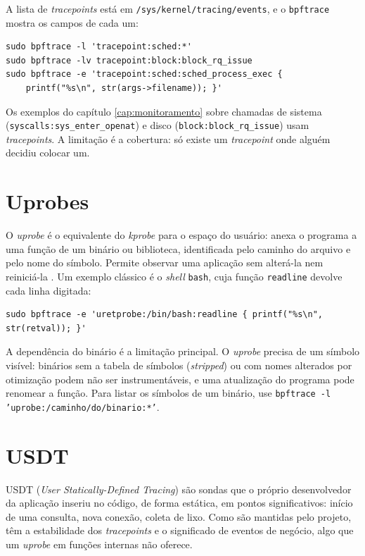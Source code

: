 A lista de \textit{tracepoints} está em \texttt{/sys/kernel/tracing/events}, e o \texttt{bpftrace} mostra os campos de cada um:

\begin{lstlisting}
sudo bpftrace -l 'tracepoint:sched:*'
sudo bpftrace -lv tracepoint:block:block_rq_issue
sudo bpftrace -e 'tracepoint:sched:sched_process_exec {
    printf("%s\n", str(args->filename)); }'
\end{lstlisting}

Os exemplos do capítulo \ref{cap:monitoramento} sobre chamadas de sistema (\texttt{syscalls:sys\_enter\_openat}) e disco (\texttt{block:block\_rq\_issue}) usam \textit{tracepoints}. A limitação é a cobertura: só existe um \textit{tracepoint} onde alguém decidiu colocar um.

\section{Uprobes}\label{sec:uprobes}

O \textit{uprobe} é o equivalente do \textit{kprobe} para o espaço do usuário: anexa o programa a uma função de um binário ou biblioteca, identificada pelo caminho do arquivo e pelo nome do símbolo. Permite observar uma aplicação sem alterá-la nem reiniciá-la \cite{gregg2019}. Um exemplo clássico é o \textit{shell} \texttt{bash}, cuja função \texttt{readline} devolve cada linha digitada:

\begin{lstlisting}
sudo bpftrace -e 'uretprobe:/bin/bash:readline { printf("%s\n", str(retval)); }'
\end{lstlisting}

A dependência do binário é a limitação principal. O \textit{uprobe} precisa de um símbolo visível: binários sem a tabela de símbolos (\textit{stripped}) ou com nomes alterados por otimização podem não ser instrumentáveis, e uma atualização do programa pode renomear a função. Para listar os símbolos de um binário, use \texttt{bpftrace -l 'uprobe:/caminho/do/binario:*'}.

\section{USDT}

USDT (\textit{User Statically-Defined Tracing}) são sondas que o próprio desenvolvedor da aplicação inseriu no código, de forma estática, em pontos significativos: início de uma consulta, nova conexão, coleta de lixo. Como são mantidas pelo projeto, têm a estabilidade dos \textit{tracepoints} e o significado de eventos de negócio, algo que um \textit{uprobe} em funções internas não oferece.

